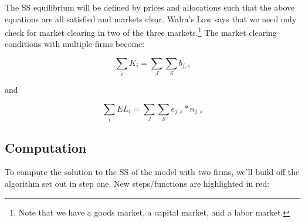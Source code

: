 \documentclass[letterpaper,12pt]{article}
\theoremstyle{definition}
\begin{document}
\begin{spacing}{1.5}
The SS equilibrium will be defined by prices and allocations such that the above equations are all satisfied and markets clear.  Walra's Law says that we need only check for market clearing in two of the three markets.\footnote{Note that we have a goods market, a capital market, and a labor market.}  The market clearing conditions with multiple firms become:

\begin{equation}
\sum_{i} K_{i} = \sum_{J}\sum_{S}b_{j,s}
\end{equation}

\noindent\noindent and 

\begin{equation}
\sum_{i} EL_{i} = \sum_{J}\sum_{S}e_{j,s}*n_{j,s}
\end{equation}


\subsection*{Computation}

To compute the solution to the SS of the model with two firms, we'll build off the algorithm set out in step one.  New steps/functions are highlighted in red:


\end{spacing}
\end{document}
